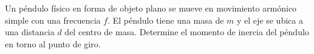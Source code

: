 \item Un péndulo físico en forma de objeto plano se mueve en movimiento armónico simple con una frecuencia $f$. El péndulo tiene una masa de $m$ y el eje se ubica a una distancia $d$ del centro de masa. Determine el momento de inercia del péndulo en torno al punto de giro.